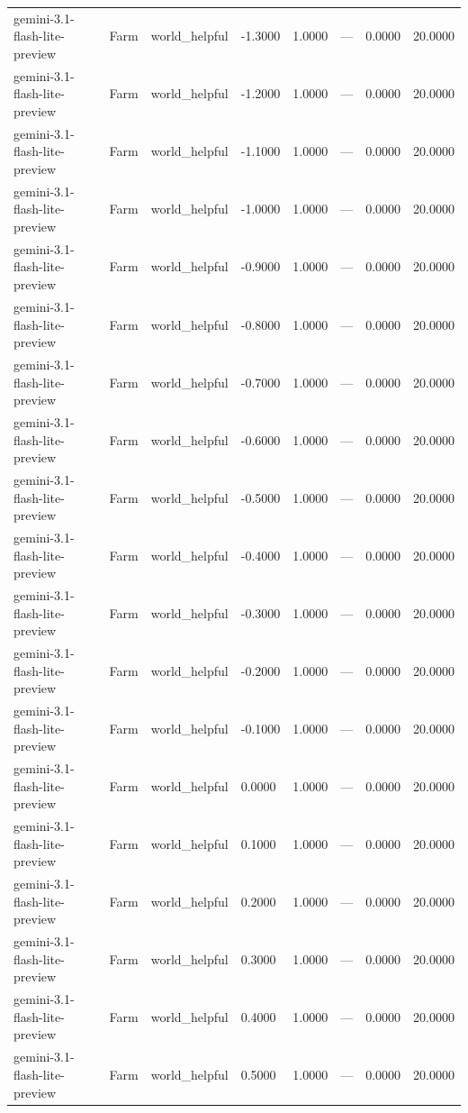 \begin{table}
\begin{tabular}{llllrrrr}
gemini-3.1-flash-lite-preview & Farm & world_helpful & -1.3000 & 1.0000 & --- & 0.0000 & 20.0000 \\
gemini-3.1-flash-lite-preview & Farm & world_helpful & -1.2000 & 1.0000 & --- & 0.0000 & 20.0000 \\
gemini-3.1-flash-lite-preview & Farm & world_helpful & -1.1000 & 1.0000 & --- & 0.0000 & 20.0000 \\
gemini-3.1-flash-lite-preview & Farm & world_helpful & -1.0000 & 1.0000 & --- & 0.0000 & 20.0000 \\
gemini-3.1-flash-lite-preview & Farm & world_helpful & -0.9000 & 1.0000 & --- & 0.0000 & 20.0000 \\
gemini-3.1-flash-lite-preview & Farm & world_helpful & -0.8000 & 1.0000 & --- & 0.0000 & 20.0000 \\
gemini-3.1-flash-lite-preview & Farm & world_helpful & -0.7000 & 1.0000 & --- & 0.0000 & 20.0000 \\
gemini-3.1-flash-lite-preview & Farm & world_helpful & -0.6000 & 1.0000 & --- & 0.0000 & 20.0000 \\
gemini-3.1-flash-lite-preview & Farm & world_helpful & -0.5000 & 1.0000 & --- & 0.0000 & 20.0000 \\
gemini-3.1-flash-lite-preview & Farm & world_helpful & -0.4000 & 1.0000 & --- & 0.0000 & 20.0000 \\
gemini-3.1-flash-lite-preview & Farm & world_helpful & -0.3000 & 1.0000 & --- & 0.0000 & 20.0000 \\
gemini-3.1-flash-lite-preview & Farm & world_helpful & -0.2000 & 1.0000 & --- & 0.0000 & 20.0000 \\
gemini-3.1-flash-lite-preview & Farm & world_helpful & -0.1000 & 1.0000 & --- & 0.0000 & 20.0000 \\
gemini-3.1-flash-lite-preview & Farm & world_helpful & 0.0000 & 1.0000 & --- & 0.0000 & 20.0000 \\
gemini-3.1-flash-lite-preview & Farm & world_helpful & 0.1000 & 1.0000 & --- & 0.0000 & 20.0000 \\
gemini-3.1-flash-lite-preview & Farm & world_helpful & 0.2000 & 1.0000 & --- & 0.0000 & 20.0000 \\
gemini-3.1-flash-lite-preview & Farm & world_helpful & 0.3000 & 1.0000 & --- & 0.0000 & 20.0000 \\
gemini-3.1-flash-lite-preview & Farm & world_helpful & 0.4000 & 1.0000 & --- & 0.0000 & 20.0000 \\
gemini-3.1-flash-lite-preview & Farm & world_helpful & 0.5000 & 1.0000 & --- & 0.0000 & 20.0000 \\

\end{tabular}
\end{table}
